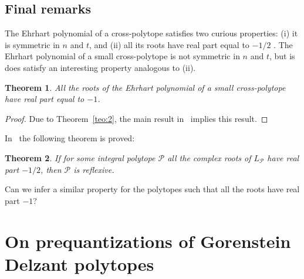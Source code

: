 \documentclass[a4paper,11pt,reqno]{amsart}
\newtheorem{theorem}{Theorem}[section]
\newtheorem{remark}[theorem]{Remark}
\begin{document}
\subsection{Final remarks}  \label{ssec:remarks}

The Ehrhart polynomial of a cross-polytope satisfies two curious properties: (i) it is symmetric in
$n$ and $t$, and (ii) all its roots have real part equal to $-1/2$ \cite{BCKV, KPT}. The Ehrhart polynomial 
of a small cross-polytope is not symmetric in $n$ and $t$, but is does satisfy an interesting property 
analogous to (ii).
\begin{theorem}
All the roots of the Ehrhart polynomial of a small cross-polytope have real part equal to $-1$.
\end{theorem}
\begin{proof} Due to Theorem~\ref{teo:2}, the main result in~\cite{R-V} implies this result.
\end{proof}

%
%
%

In~\cite{BHW} the following theorem is proved:
\begin{theorem}
If for some integral polytope $\mathcal{P}$ all the complex roots of $L_\mathcal{P}$ have real part $-1/2$, then $\mathcal{P}$ is reflexive.
\end{theorem}
\noindent Can we infer a similar property for the polytopes such that all the roots have real part $-1$?

\section{On prequantizations of Gorenstein Delzant polytopes}
\label{sec:monotone}
\end{document}
